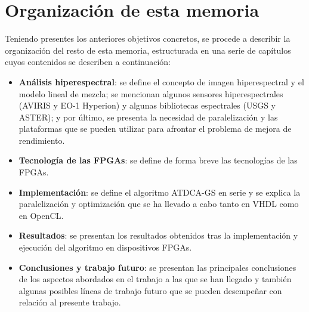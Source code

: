 





\section{Organización de esta memoria}

Teniendo presentes los anteriores objetivos concretos, se procede a describir la organización del resto de esta memoria, estructurada en una serie de capítulos cuyos contenidos se describen a continuación:

\begin{itemize}
    \item \textbf{Análisis hiperespectral}: se define el concepto de imagen hiperespectral y el modelo lineal de mezcla; se mencionan algunos sensores hiperespectrales (AVIRIS y EO-1 Hyperion) y algunas bibliotecas espectrales (USGS y ASTER); y por último, se presenta la necesidad de paralelización y las plataformas que se pueden utilizar para afrontar el problema de mejora de rendimiento.
    \item \textbf{Tecnología de las FPGAs}: se define de forma breve las tecnologías de las FPGAs.
    \item \textbf{Implementación}: se define el algoritmo ATDCA-GS en serie y se explica la paralelización y optimización que se ha llevado a cabo tanto en VHDL como en OpenCL.
    \item \textbf{Resultados}: se presentan los resultados obtenidos tras la implementación y ejecución del algoritmo en dispositivos FPGAs.
    \item \textbf{Conclusiones y trabajo futuro}: se presentan las principales conclusiones de los aspectos abordados en el trabajo a las que se han llegado y también algunas posibles líneas de trabajo futuro que se pueden desempeñar con relación al presente trabajo.
\end{itemize}





